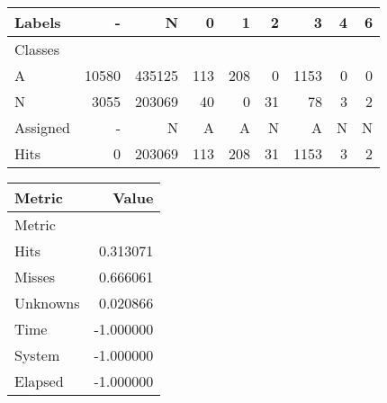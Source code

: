 \begin{tabular}{l|r|r|r|r|r|r|r|r}

Labels &      - &       N &    0 &    1 &   2 &     3 &  4 &  6 \\\hline
Classes  &        &         &      &      &     &       &    &    \\\hline
\hline
A        &  10580 &  435125 &  113 &  208 &   0 &  1153 &  0 &  0 \\\hline
N        &   3055 &  203069 &   40 &    0 &  31 &    78 &  3 &  2 \\\hline
\hline
Assigned &      - &       N &    A &    A &   N &     A &  N &  N \\\hline
Hits     &      0 &  203069 &  113 &  208 &  31 &  1153 &  3 &  2 
\end{tabular}
\begin{tabular}{l|r}

Metric   &     Value \\\hline
Metric   &           \\\hline
\hline
Hits     &  0.313071 \\\hline
Misses   &  0.666061 \\\hline
Unknowns &  0.020866 \\\hline
Time     & -1.000000 \\\hline
System   & -1.000000 \\\hline
Elapsed  & -1.000000 
\end{tabular}
